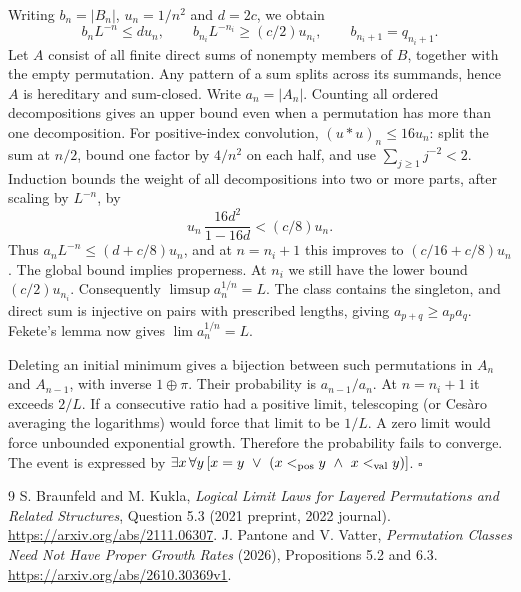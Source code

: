 \documentclass[11pt]{article}
\begin{document}
Writing $b_n=|B_n|$, $u_n=1/n^2$ and $d=2c$, we obtain
\[
 b_nL^{-n}\le d u_n,\qquad b_{n_i}L^{-n_i}\ge(c/2)u_{n_i},\qquad b_{n_i+1}=q_{n_i+1}.
\]
Let $A$ consist of all finite direct sums of nonempty members of $B$, together with the empty permutation. Any pattern of a sum splits across its summands, hence $A$ is hereditary and sum-closed. Write $a_n=|A_n|$. Counting all ordered decompositions gives an upper bound even when a permutation has more than one decomposition. For positive-index convolution, $(u*u)_n\le16u_n$: split the sum at $n/2$, bound one factor by $4/n^2$ on each half, and use $\sum_{j\ge1}j^{-2}<2$. Induction bounds the weight of all decompositions into two or more parts, after scaling by $L^{-n}$, by
\[
 u_n\,\frac{16d^2}{1-16d}< (c/8)u_n .
\]
Thus $a_nL^{-n}\le (d+c/8)u_n$, and at $n=n_i+1$ this improves to $(c/16+c/8)u_n$. The global bound implies properness. At $n_i$ we still have the lower bound $(c/2)u_{n_i}$. Consequently $\limsup a_n^{1/n}=L$. The class contains the singleton, and direct sum is injective on pairs with prescribed lengths, giving $a_{p+q}\ge a_p a_q$. Fekete's lemma now gives $\lim a_n^{1/n}=L$.

Deleting an initial minimum gives a bijection between such permutations in $A_n$ and $A_{n-1}$, with inverse $1\oplus\pi$. Their probability is $a_{n-1}/a_n$. At $n=n_i+1$ it exceeds $2/L$. If a consecutive ratio had a positive limit, telescoping (or Ces\`aro averaging the logarithms) would force that limit to be $1/L$. A zero limit would force unbounded exponential growth. Therefore the probability fails to converge. The event is expressed by $\exists x\,\forall y\,[x=y\ \lor\ (x<_{\rm pos}y\ \land\ x<_{\rm val}y)]$. \hfill$\square$
\begin{thebibliography}{9}
 S. Braunfeld and M. Kukla, \emph{Logical Limit Laws for Layered Permutations and Related Structures}, Question 5.3 (2021 preprint, 2022 journal). \url{https://arxiv.org/abs/2111.06307}.
 J. Pantone and V. Vatter, \emph{Permutation Classes Need Not Have Proper Growth Rates} (2026), Propositions 5.2 and 6.3. \url{https://arxiv.org/abs/2610.30369v1}.
\end{thebibliography}
\end{document}
